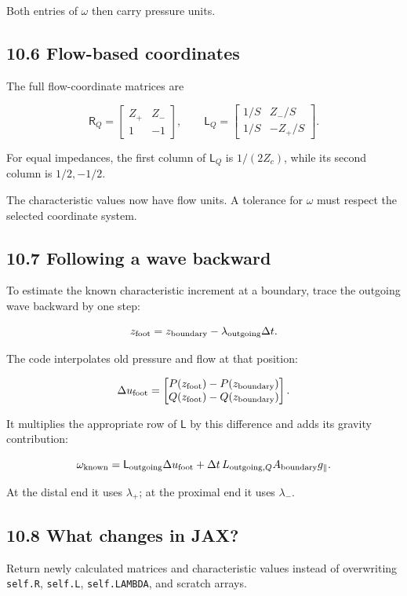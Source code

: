 \documentclass[11pt,a4paper]{article}
\begin{document}
Both entries of \(\omega\) then carry pressure units.

\subsection{10.6 Flow-based coordinates}
The full flow-coordinate matrices are


\begingroup\small
\[
\mathsf R_Q=
\begin{bmatrix}
Z_+&Z_-\\
1&-1
\end{bmatrix},
\qquad
\mathsf L_Q=
\begin{bmatrix}
1/S&Z_-/S\\
1/S&-Z_+/S
\end{bmatrix}.
\]
\endgroup


For equal impedances, the first column of \(\mathsf L_Q\) is \(1/(2Z_c)\), while its second column is \(1/2,-1/2\).

The characteristic values now have flow units. A tolerance for \(\omega\) must respect the selected coordinate system.

\subsection{10.7 Following a wave backward}
To estimate the known characteristic increment at a boundary, trace the outgoing wave backward by one step:


\begingroup\small
\[
z_{\rm foot}=z_{\rm boundary}-\lambda_{\rm outgoing}\Delta t.
\]
\endgroup


The code interpolates old pressure and flow at that position:


\begingroup\small
\[
\Delta u_{\rm foot}
=
\begin{bmatrix}
P(z_{\rm foot})-P(z_{\rm boundary})\\
Q(z_{\rm foot})-Q(z_{\rm boundary})
\end{bmatrix}.
\]
\endgroup


It multiplies the appropriate row of \(\mathsf L\) by this difference and adds its gravity contribution:


\begingroup\small
\[
\omega_{\rm known}
=\mathsf L_{\rm outgoing}\Delta u_{\rm foot}
+\Delta t\,L_{{\rm outgoing},Q}A_{\rm boundary}g_\parallel.
\]
\endgroup


At the distal end it uses \(\lambda_+\); at the proximal end it uses \(\lambda_-\).

\subsection{10.8 What changes in JAX?}
Return newly calculated matrices and characteristic values instead of overwriting \texttt{self.\allowbreak{}R}, \texttt{self.\allowbreak{}L}, \texttt{self.\allowbreak{}LAMBDA}, and scratch arrays.
\end{document}
